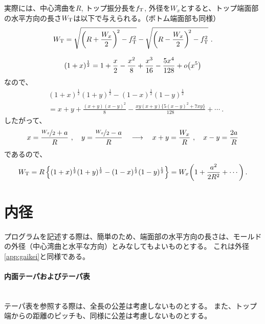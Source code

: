 実際には、中心湾曲を$R$, トップ振分長を$f_\text T$, 外径を$W_x$とすると、トップ端面部の水平方向の長さ$W_\text T$は以下で与えられる。（ボトム端面部も同様）
\begin{equation}
  \notag
  W_\text T = \sqrt{\left(R+\frac{W_x}2\right)^{\!2}-f_\text T^2}-\sqrt{\left(R-\frac{W_x}2\right)^{\!2}-f_\text T^2}\ .
\end{equation}
\begin{tcolorbox}
\begin{equation}
  \notag
  (1+x)^\frac12 = 1+\frac x2-\frac{x^2}8+\frac{x^3}{16}-\frac{5x^4}{128}+o\!\left(x^5\right)
\end{equation}
なので、
\begin{align*}
  & (1+x)^\frac12(1+y)^\frac12-(1-x)^\frac12(1-y)^\frac12\\
  &= x+y+\frac{(x+y)(x-y)^2}8-\frac{xy(x+y)\big\{5(x-y)^2+7xy\big\}}{128}+\cdots\ .
\end{align*}
したがって、
\begin{equation}
  \notag
  x = \frac{\nicefrac{W_x}2+a}R\ ,\quad y = \frac{\nicefrac{W_x}2-a}R\quad
  \longrightarrow \quad
  x+y = \frac{W_x}R\ , \quad x-y = \frac{2a}R
\end{equation}
であるので、
\begin{align*}
  W_\text T
  = R\left\{(1+x)^\frac12(1+y)^\frac12-(1-x)^\frac12(1-y)^\frac12\right\}
  = W_x\!\left(1+\frac{a^2}{2R^2}+\cdots\right).
\end{align*}
\end{tcolorbox}




\section{内径}
プログラムを記述する際は、簡単のため、端面部の水平方向の長さは、モールドの外径（中心湾曲と水平な方向）とみなしてもよいものとする。
これは外径\hyperref[app:gaikei]{\ref{app:gaikei}}と同様である。

\paragraph{内面テーパおよびテーパ表}　\\
テーパ表を参照する際は、全長の公差は考慮しないものとする。
また、トップ端からの距離のピッチも、同様に公差は考慮しないものとする。

